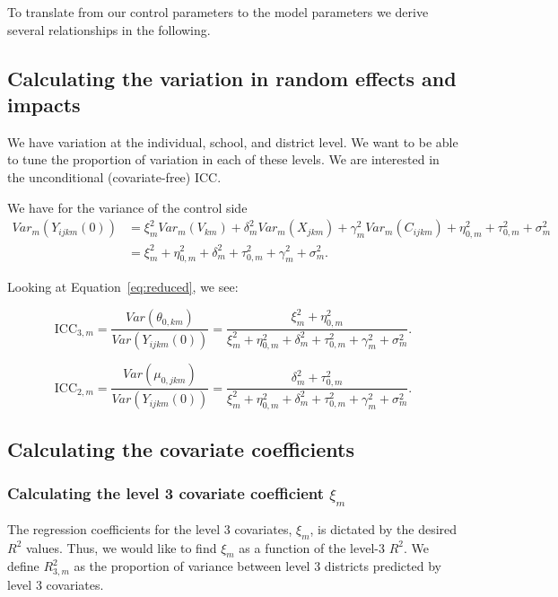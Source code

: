 \documentclass[12pt]{article}
\begin{document}
To translate from our control parameters to the model parameters we derive several relationships in the following.


\subsection{Calculating the variation in random effects and impacts}

We have variation at the individual, school, and district level.
We want to be able to tune the proportion of variation in each of these levels.
We are interested in the unconditional (covariate-free) ICC.

We have for the variance of the control side
\begin{align*}
Var_m( Y_{ijkm}(0) ) &= \xi_m^2 Var_m(V_{km}) + \delta_m^2 Var_m(X_{jkm}) + \gamma_m^2 Var_m(C_{ijkm}) + \eta^2_{0,m} + \tau^2_{0,m} + \sigma^2_m \\
&=  \xi_m^2 +  \eta^2_{0,m} + \delta_m^2  + \tau^2_{0,m} + \gamma_m^2 + \sigma^2_m.
\end{align*}

Looking at Equation~\ref{eq:reduced}, we see:

\[ \text{ICC}_{3,m} = \frac{Var(\theta_{0,km})}{ Var(Y_{ijkm}(0))} = \frac{\xi^2_m + \eta_{0,m}^2}{\xi_m^2 +  \eta^2_{0,m} + \delta_m^2  + \tau^2_{0,m} + \gamma_m^2 + \sigma^2_m}.\]

\[ \text{ICC}_{2,m} = \frac{Var(\mu_{0,jkm})}{ Var(Y_{ijkm}(0))} = \frac{\delta_m^2  + \tau_{0,m}^2}{\xi_m^2 +  \eta^2_{0,m} + \delta_m^2  + \tau^2_{0,m} + \gamma_m^2 + \sigma^2_m} .\]


\subsection{Calculating the covariate coefficients}

\subsubsection{Calculating the level 3 covariate coefficient $\xi_m$}

The regression coefficients for the level 3 covariates, $\xi_m$, is dictated by the desired $R^2$ values.
Thus, we would like to find $\xi_m$ as a function of the level-3 $R^2$.
We define $R^2_{3,m}$ as the proportion of variance between level 3 districts predicted by level 3 covariates.
\end{document}
